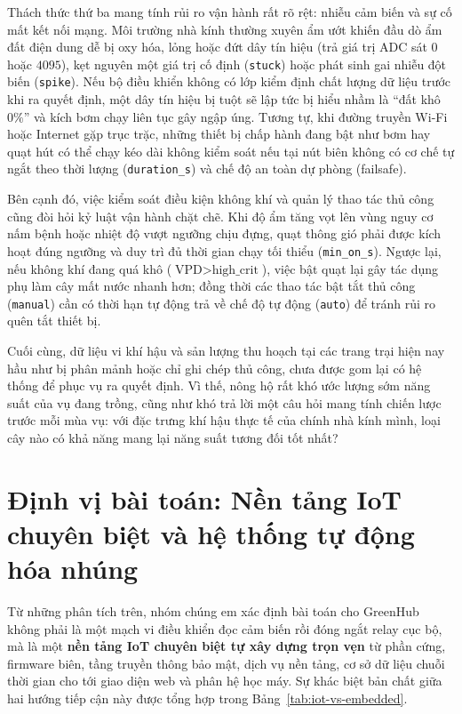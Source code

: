 Thách thức thứ ba mang tính rủi ro vận hành rất rõ rệt: nhiễu cảm biến và sự cố mất kết nối mạng. Môi trường nhà kính thường xuyên ẩm ướt khiến đầu dò ẩm đất điện dung dễ bị oxy hóa, lỏng hoặc đứt dây tín hiệu (trả giá trị ADC sát \(0\) hoặc \(4095\)), kẹt nguyên một giá trị cố định (\texttt{stuck}) hoặc phát sinh gai nhiễu đột biến (\texttt{spike}). Nếu bộ điều khiển không có lớp kiểm định chất lượng dữ liệu trước khi ra quyết định, một dây tín hiệu bị tuột sẽ lập tức bị hiểu nhầm là ``đất khô \(0\%\)'' và kích bơm chạy liên tục gây ngập úng. Tương tự, khi đường truyền Wi-Fi hoặc Internet gặp trục trặc, những thiết bị chấp hành đang bật như bơm hay quạt hút có thể chạy kéo dài không kiểm soát nếu tại nút biên không có cơ chế tự ngắt theo thời lượng (\texttt{duration\_s}) và chế độ an toàn dự phòng (failsafe).

Bên cạnh đó, việc kiểm soát điều kiện không khí và quản lý thao tác thủ công cũng đòi hỏi kỷ luật vận hành chặt chẽ. Khi độ ẩm tăng vọt lên vùng nguy cơ nấm bệnh hoặc nhiệt độ vượt ngưỡng chịu đựng, quạt thông gió phải được kích hoạt đúng ngưỡng và duy trì đủ thời gian chạy tối thiểu (\texttt{min\_on\_s}). Ngược lại, nếu không khí đang quá khô (\(\text{VPD} > \text{high\_crit}\)), việc bật quạt lại gây tác dụng phụ làm cây mất nước nhanh hơn; đồng thời các thao tác bật tắt thủ công (\texttt{manual}) cần có thời hạn tự động trả về chế độ tự động (\texttt{auto}) để tránh rủi ro quên tắt thiết bị.

Cuối cùng, dữ liệu vi khí hậu và sản lượng thu hoạch tại các trang trại hiện nay hầu như bị phân mảnh hoặc chỉ ghi chép thủ công, chưa được gom lại có hệ thống để phục vụ ra quyết định. Vì thế, nông hộ rất khó ước lượng sớm năng suất của vụ đang trồng, cũng như khó trả lời một câu hỏi mang tính chiến lược trước mỗi mùa vụ: với đặc trưng khí hậu thực tế của chính nhà kính mình, loại cây nào có khả năng mang lại năng suất tương đối tốt nhất?

\section{Định vị bài toán: Nền tảng IoT chuyên biệt và hệ thống tự động hóa nhúng}
\label{sec:c1-positioning}

Từ những phân tích trên, nhóm chúng em xác định bài toán cho GreenHub không phải là một mạch vi điều khiển đọc cảm biến rồi đóng ngắt relay cục bộ, mà là một \textbf{nền tảng IoT chuyên biệt tự xây dựng trọn vẹn} từ phần cứng, firmware biên, tầng truyền thông bảo mật, dịch vụ nền tảng, cơ sở dữ liệu chuỗi thời gian cho tới giao diện web và phân hệ học máy. Sự khác biệt bản chất giữa hai hướng tiếp cận này được tổng hợp trong Bảng~\ref{tab:iot-vs-embedded}.


